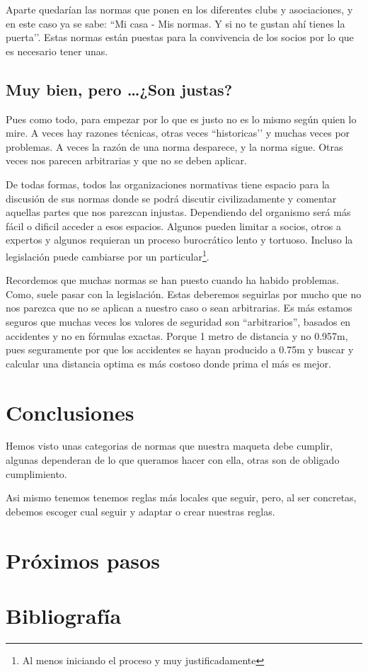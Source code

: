 Aparte quedarían las normas que ponen en los diferentes clubs y asociaciones, y en este caso ya se sabe:
``Mi casa - Mis normas. Y si no te gustan ahí tienes la puerta’’. Estas normas están puestas para la convivencia de los socios por lo que es necesario tener unas.

\subsection{Muy bien, pero \dots ¿Son justas?}
Pues como todo, para empezar por lo que es justo no es lo mismo según quien lo mire. A veces hay razones técnicas, otras veces ``historicas’’ y muchas veces por problemas. A veces la razón de una norma desparece, y la norma sigue. Otras veces nos parecen arbitrarias y que no se deben aplicar.

De todas formas, todos las organizaciones normativas tiene espacio para la discusión de sus normas donde se podrá discutir civilizadamente y comentar aquellas partes que nos parezcan injustas. Dependiendo del organismo será más fácil o dificil acceder a esos espacios. Algunos pueden limitar a socios, otros a expertos y algunos requieran un proceso burocrático lento y tortuoso. Incluso la legislación puede cambiarse por un particular\footnote{Al menos iniciando el proceso y muy justificadamente}.

Recordemos que muchas normas se han puesto cuando ha habido problemas. Como, suele pasar con la legislación. Estas deberemos seguirlas por mucho que no nos parezca que no se aplican a nuestro caso o sean arbitrarias. Es más estamos seguros que muchas veces los valores de seguridad son ``arbitrarios'', basados en accidentes y no en fórmulas exactas. Porque 1 metro de distancia y no 0.957m, pues seguramente por que los accidentes se hayan producido a 0.75m y buscar y calcular una distancia optima es más costoso donde prima el más es mejor.

\section{Conclusiones}
Hemos visto unas categorias de normas que nuestra maqueta debe cumplir, algunas dependeran de lo que queramos hacer con ella, otras son de obligado cumplimiento.

Asi mismo tenemos tenemos reglas más locales que seguir, pero, al ser concretas, debemos escoger cual seguir y adaptar o crear nuestras reglas.
\section{Próximos pasos}

\section{Bibliografía}
\printbibliography[heading=subbibliography]